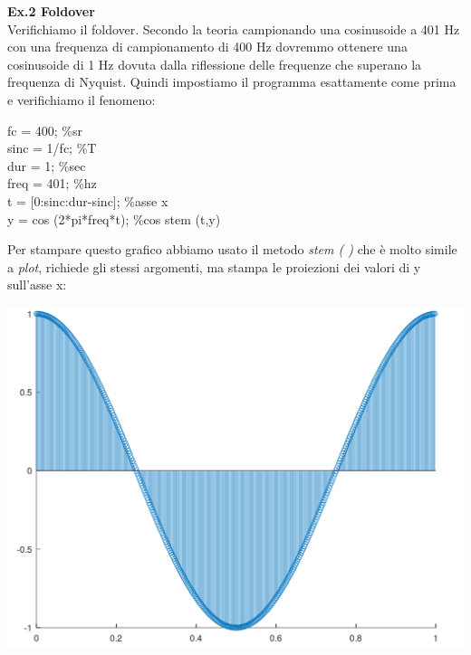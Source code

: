 \documentclass[11pt]{article}
\begin{document}
\begin{multicols*}{2}
\textbf{\textsf {Ex.2 Foldover}} \\

\noindent Verifichiamo il foldover. Secondo la teoria campionando una cosinusoide a 401 Hz con una frequenza di campionamento di 400 Hz dovremmo ottenere una cosinusoide di 1 Hz dovuta dalla riflessione delle frequenze che superano la frequenza di Nyquist. Quindi impostiamo il programma esattamente come prima e verifichiamo il fenomeno:

\begin{center}
\begin{minipage}[c]{5cm}
\begin{sffamily}

fc = 400;    \%sr\\
sinc = 1/fc;   \%T\\
dur = 1;      \%sec\\
freq = 401;    \%hz\\
t = [0:sinc:dur-sinc]; \%asse x\\
y = cos (2*pi*freq*t); \%cos
stem (t,y)

\end{sffamily}
\end{minipage}
\end{center}

\noindent Per stampare questo grafico abbiamo usato il metodo \textit {stem ( )} che è molto simile a \textit {plot}, richiede gli stessi argomenti, ma stampa le proiezioni dei valori di y sull’asse x:

\begin{center}
\includegraphics[scale=0.2]{images/plot03.png}


\end{center}
\end{multicols*}
\end{document}
